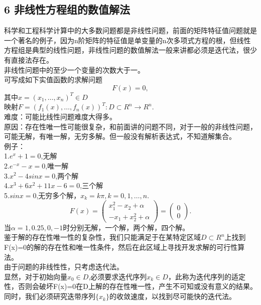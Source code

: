 \documentclass[a4paper,12pt]{article}
\begin{document}
\begin{CJK*}{UTF8}{gbsn}
	\section{6 非线性方程组的数值解法}
	科学和工程科学计算中的大多数问题都是非线性问题，前面的矩阵特征值问题就是一个著名的例子，因为n阶矩阵的特征值是单变量的n次多项式方程的根，但线性方程组是典型的线性问题，非线性问题的数值解法一般来讲都必须是迭代法，很少有直接法存在。\\
	非线性问题中的至少一个变量的次数大于一。\\
	可写成如下实值函数的求解问题
	$$F(x)=0,$$
	其中$x=(x_1,\ldots,x_n)^T\in D$\\
	映射$F=(f_1(x),\ldots,f_n(x))^T : D\subset R^n \to R^n.$\\
	难度：可能比线性问题难度大得多。\\
	原因：存在性唯一性可能很复杂，和前面讲的问题不同，对于一般的非线性问题，可能无解，有唯一解，无穷多解。但一般没有解析表达式，不知道解集合。\\
	例子：\\
	1.$e^x + 1 =0$,无解\\
	2.$e^{-x} -x = 0$,唯一解\\
	3.$x^2-4sinx=0$,两个解\\
	4.$x^3+6x^2+11x-6=0$,三个解\\
	5.$sinx=0$,无穷多个解，$x_k=k\pi,k=0,1,\ldots,n.$
	$$F(x) = \left( \begin{array}{c} x_1^2-x_2+\alpha\\-x_1+x_2^2+\alpha \end{array}\right)
	= \left( \begin{array}{c}0\\0 \end{array} \right).$$
	当$\alpha=1,0.25,0,-1$时分别无解，一个解，两个解，四个解。\\
	鉴于解的存在性唯一性的复杂性，我们只能满足于在某特定区域$D\subset R^n$上找到F(x)=0的解的存在性和唯一性条件，然后在此区域上寻找开发求解的可行性算法。\\
	由于问题的非线性性，只考虑迭代法。\\
	显然，对于初始向量$x_0\in D$,必须要求迭代序列${x_k}\in D$，此称为迭代序列的适定性，否则会破坏F(x)=0在D上解的存在性唯一性，产生不可知或没有意义的结果。\\
	同时，我们必须研究迭带序列$\{x_k\}$的收敛速度，以找到尽可能快的迭代法。\\

\end{CJK*}
\end{document}
